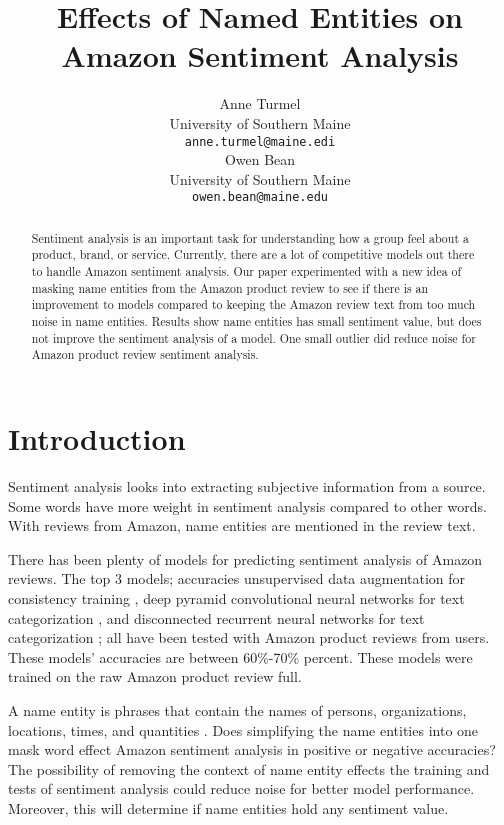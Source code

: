 \documentclass[11pt,a4paper]{article}
\title{Effects of Named Entities on Amazon Sentiment Analysis}
\author{Anne Turmel \\
  University of Southern Maine \\
  \texttt{anne.turmel@maine.edi} \\\And
  Owen Bean \\
  University of Southern Maine \\
  \texttt{owen.bean@maine.edu} \\}
\begin{document}
\maketitle
\begin{abstract}
Sentiment analysis is an important task for understanding how a group feel about a product, brand, or service. Currently, there are a lot of competitive models out there to handle Amazon sentiment analysis. Our paper experimented with a new idea of masking name entities from the Amazon product review to see if there is an improvement to models compared to keeping the Amazon review text from too much noise in name entities. Results show name entities has small sentiment value, but does not improve the sentiment analysis of a model. One small outlier did reduce noise for Amazon product review sentiment analysis.

\end{abstract}

\section{Introduction}

Sentiment analysis looks into extracting subjective information from a source. Some words have more weight in sentiment analysis compared to other words. With reviews from Amazon, name entities are mentioned in the review text.

There has been plenty of models for predicting sentiment analysis of Amazon reviews. The top 3 models; accuracies unsupervised data augmentation for consistency training \cite{unsupervised}, deep pyramid convolutional neural networks for text categorization \cite{pyramid}, and disconnected recurrent neural networks for text categorization \cite{disconnect}; all have been tested with Amazon product reviews from users. These models' accuracies are between 60\%-70\% percent. These models were trained on the raw Amazon product review full.

A name entity is phrases that contain the names of persons, organizations, locations, times, and quantities \cite{conll}. Does simplifying the name entities into one mask word effect Amazon sentiment analysis in positive or negative accuracies? The possibility of removing the context of name entity effects the training and tests of sentiment analysis could reduce noise for better model performance. Moreover, this will determine if name entities hold any sentiment value.
\end{document}
